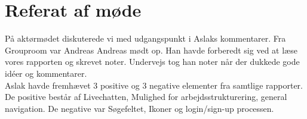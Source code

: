 \documentclass[12pt]{article}
\begin{document}

\clearpage\maketitle
\thispagestyle{empty}

\newpage

\thispagestyle{empty}

\newpage
\pagestyle{plain}
\setcounter{page}{1}
\section*{Referat af møde}
\noindent På aktørmødet diskuterede vi med udgangspunkt i Aslaks kommentarer. Fra Grouproom var Andreas Andreas mødt op. Han havde forberedt sig ved at læse vores rapporten og skrevet noter. Undervejs tog han noter når der dukkede gode idéer og kommentarer. \\
Aslak havde fremhævet 3 positive og 3 negative elementer fra samtlige rapporter. 
De positive består af Livechatten, Mulighed for arbejdsstrukturering, general navigation. 
De negative var Søgefeltet, Ikoner og login/sign-up processen. \\
\end{document}
